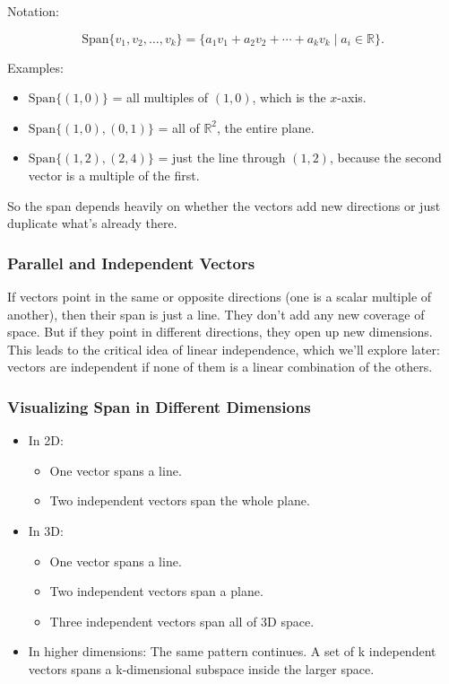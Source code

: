 \documentclass[
  letterpaper,
  DIV=11,
  numbers=noendperiod]{scrreprt}
\providecommand{\tightlist}{%
  \setlength{\itemsep}{0pt}\setlength{\parskip}{0pt}}
\begin{document}
Notation:

\[
\text{Span}\{v_1, v_2, \ldots, v_k\} =
\{a_1 v_1 + a_2 v_2 + \cdots + a_k v_k \;|\; a_i \in \mathbb{R}\}.
\]

Examples:

\begin{itemize}
\tightlist
\item
  \(\text{Span}\{(1, 0)\}\) = all multiples of \((1, 0)\), which is the
  \(x\)-axis.\\
\item
  \(\text{Span}\{(1, 0), (0, 1)\}\) = all of \(\mathbb{R}^2\), the
  entire plane.\\
\item
  \(\text{Span}\{(1, 2), (2, 4)\}\) = just the line through \((1, 2)\),
  because the second vector is a multiple of the first.
\end{itemize}

So the span depends heavily on whether the vectors add new directions or
just duplicate what's already there.

\subsubsection{Parallel and Independent
Vectors}\label{parallel-and-independent-vectors}

If vectors point in the same or opposite directions (one is a scalar
multiple of another), then their span is just a line. They don't add any
new coverage of space. But if they point in different directions, they
open up new dimensions. This leads to the critical idea of linear
independence, which we'll explore later: vectors are independent if none
of them is a linear combination of the others.

\subsubsection{Visualizing Span in Different
Dimensions}\label{visualizing-span-in-different-dimensions}

\begin{itemize}
\item
  In 2D:

  \begin{itemize}
  \tightlist
  \item
    One vector spans a line.
  \item
    Two independent vectors span the whole plane.
  \end{itemize}
\item
  In 3D:

  \begin{itemize}
  \tightlist
  \item
    One vector spans a line.
  \item
    Two independent vectors span a plane.
  \item
    Three independent vectors span all of 3D space.
  \end{itemize}
\item
  In higher dimensions: The same pattern continues. A set of k
  independent vectors spans a k-dimensional subspace inside the larger
  space.
\end{itemize}
\end{document}
